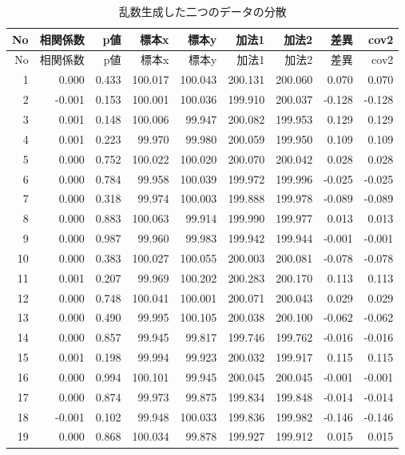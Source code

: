 \documentclass[]{tufte-handout}
\begin{document}
\begin{longtable}[]{@{}rrrrrrrrr@{}}
\caption{乱数生成した二つのデータの分散}\tabularnewline
\toprule
No & 相関係数 & p値 & 標本x & 標本y & 加法1 & 加法2 & 差異 & cov2 \\
\midrule
\endfirsthead
\toprule
No & 相関係数 & p値 & 標本x & 標本y & 加法1 & 加法2 & 差異 & cov2 \\
\midrule
\endhead
1 & 0.000 & 0.433 & 100.017 & 100.043 & 200.131 & 200.060 & 0.070 &
0.070 \\
2 & -0.001 & 0.153 & 100.001 & 100.036 & 199.910 & 200.037 & -0.128 &
-0.128 \\
3 & 0.001 & 0.148 & 100.006 & 99.947 & 200.082 & 199.953 & 0.129 &
0.129 \\
4 & 0.001 & 0.223 & 99.970 & 99.980 & 200.059 & 199.950 & 0.109 &
0.109 \\
5 & 0.000 & 0.752 & 100.022 & 100.020 & 200.070 & 200.042 & 0.028 &
0.028 \\
6 & 0.000 & 0.784 & 99.958 & 100.039 & 199.972 & 199.996 & -0.025 &
-0.025 \\
7 & 0.000 & 0.318 & 99.974 & 100.003 & 199.888 & 199.978 & -0.089 &
-0.089 \\
8 & 0.000 & 0.883 & 100.063 & 99.914 & 199.990 & 199.977 & 0.013 &
0.013 \\
9 & 0.000 & 0.987 & 99.960 & 99.983 & 199.942 & 199.944 & -0.001 &
-0.001 \\
10 & 0.000 & 0.383 & 100.027 & 100.055 & 200.003 & 200.081 & -0.078 &
-0.078 \\
11 & 0.001 & 0.207 & 99.969 & 100.202 & 200.283 & 200.170 & 0.113 &
0.113 \\
12 & 0.000 & 0.748 & 100.041 & 100.001 & 200.071 & 200.043 & 0.029 &
0.029 \\
13 & 0.000 & 0.490 & 99.995 & 100.105 & 200.038 & 200.100 & -0.062 &
-0.062 \\
14 & 0.000 & 0.857 & 99.945 & 99.817 & 199.746 & 199.762 & -0.016 &
-0.016 \\
15 & 0.001 & 0.198 & 99.994 & 99.923 & 200.032 & 199.917 & 0.115 &
0.115 \\
16 & 0.000 & 0.994 & 100.101 & 99.945 & 200.045 & 200.045 & -0.001 &
-0.001 \\
17 & 0.000 & 0.874 & 99.973 & 99.875 & 199.834 & 199.848 & -0.014 &
-0.014 \\
18 & -0.001 & 0.102 & 99.948 & 100.033 & 199.836 & 199.982 & -0.146 &
-0.146 \\
19 & 0.000 & 0.868 & 100.034 & 99.878 & 199.927 & 199.912 & 0.015 &
0.015 \\

\end{longtable}
\end{document}
